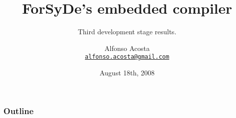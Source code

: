 \documentclass{beamer}
\title%
{ForSyDe's embedded compiler}
\subtitle{Third development stage results.}
\author[A.Acosta] %
{Alfonso Acosta\\
\footnotesize \href{mailto:alfonso.acosta@gmail.com}{\nolinkurl{alfonso.acosta@gmail.com}}}
\institute[KTH] %
{ICT/ECS\\Royal Institute of Technology, Stockholm}
\date%
{August 18th, 2008}
\begin{document}
\begin{frame}
  \titlepage
\end{frame}

\begin{frame}
  \frametitle{Outline}
  \tableofcontents[pausesections]
\end{frame}





\beamerdefaultoverlayspecification{}
\end{document}
